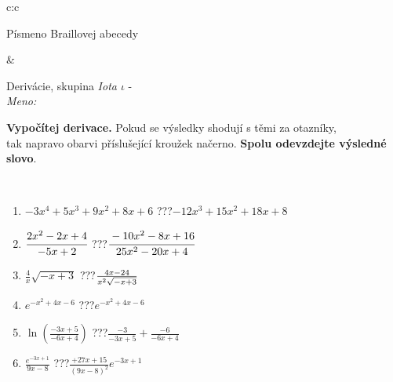 \documentclass[10pt]{report}
\begin{document}
\begin{tabular}{c:c}
\begin{minipage}[c][104.5mm][t]{0.5\linewidth}
\begin{center}
\begin{minipage}{0.20\linewidth}
\begin{center}
{\small Písmeno Braillovej abecedy}
\end{center}
\end{minipage}
\end{center}
\end{minipage}
&
\begin{minipage}[c][104.5mm][t]{0.5\linewidth}
\begin{center}
\vspace{7mm}
{\huge Derivácie, skupina \textit{Iota $\iota$} -}\\[5mm]
\textit{Meno:}\phantom{xxxxxxxxxxxxxxxxxxxxxxxxxxxxxxxxxxxxxxxxxxxxxxxxxxxxxxxxxxxxxxxxx}\\[5mm]
\begin{minipage}{0.95\linewidth}
\begin{center}
\textbf{Vypočítej derivace.} Pokud se výsledky shodují s těmi za otazníky,\\tak napravo obarvi příslušející kroužek načerno. \textbf{Spolu odevzdejte výsledné slovo}.
\end{center}
\end{minipage}
\\[1mm]
\begin{minipage}{0.79\linewidth}
\begin{center}
\begin{varwidth}{\linewidth}
\begin{enumerate}
\normalsize
\item $-3x^4+5x^3+9x^2+8x+6$\quad \dotfill\; ???\;\dotfill \quad $-12x^3+15x^2+18x+8$
\item $\cfrac{2x^2-2x+4}{-5x+2}$\quad \dotfill\; ???\;\dotfill \quad $\cfrac{-10x^2-8x+16}{25x^2-20x+4}$
\item $\frac{4}{x}\sqrt{-x+3}$\quad \dotfill\; ???\;\dotfill \quad $\frac{4x-24}{x^2 \sqrt{\smash[b]{-x+3}}}$
\item $e^{-x^2+4x-6}$\quad \dotfill\; ???\;\dotfill \quad $e^{-x^2+4x-6}$
\item $\ln{\left(\frac{-3x+5}{-6x+4}\right)}$\quad \dotfill\; ???\;\dotfill \quad $\frac{-3}{-3x+5}+\frac{-6}{-6x+4}$
\item $\frac{e^{-3x+1}}{9x-8}$\quad \dotfill\; ???\;\dotfill \quad $\frac{+27x+15}{(9x-8)^2}e^{-3x+1}$
\end{enumerate}
\end{varwidth}
\end{center}
\end{minipage}
\begin{minipage}{0.20\linewidth}
\begin{center}

\end{center}
\end{minipage}
\end{center}
\end{minipage}
\end{tabular}
\end{document}
